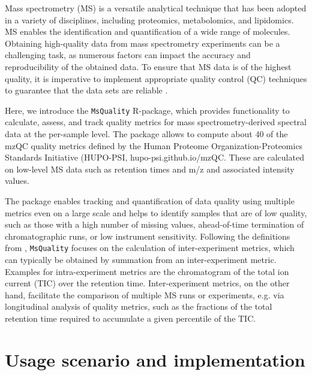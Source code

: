 \documentclass{bioinfo}
\begin{document}

\maketitle

Mass spectrometry (MS) is a versatile analytical technique that has been 
adopted in a variety of disciplines, including proteomics, metabolomics, and 
lipidomics. MS enables the identification and quantification of a wide range 
of molecules. Obtaining high-quality data from mass spectrometry experiments 
can be a challenging task, as numerous factors can impact the accuracy and 
reproducibility of the obtained data. To ensure that MS data is of the 
highest quality, it is imperative to implement appropriate quality control 
(QC) techniques to guarantee that the data sets are reliable 
\citep{Koecher2011}.

Here, we introduce the \texttt{MsQuality} R-package, which provides 
functionality to calculate, assess, and track quality metrics for mass 
spectrometry-derived spectral data at the per-sample level. 
The package allows to compute about 40 of the mzQC quality metrics defined by
the Human Proteome Organization-Proteomics Standards Initiative (HUPO-PSI,
hupo-psi.github.io/mzQC. These are calculated on low-level MS data
such as retention times and m/z and associated intensity values.

The package enables tracking and quantification of data quality using 
multiple metrics even on a large scale and helps to identify samples that 
are of low quality, such as those with a high number of missing values, 
ahead-of-time termination of chromatographic runs, or low instrument sensitivity. 
Following the definitions from \cite{Bittremieux2017}, \texttt{MsQuality}
focuses on the calculation of inter-experiment metrics, which can typically be 
obtained by summation from an inter-experiment metric. Examples for
intra-experiment metrics are the chromatogram of the total ion current (TIC) 
over the retention time. Inter-experiment metrics, on the other hand, 
facilitate the comparison of multiple MS runs or experiments, 
e.g. via longitudinal analysis of quality metrics, such as the
fractions of the total retention time required to accumulate a given
percentile of the TIC.

\section{Usage scenario and implementation} \label{usagescenario}
\end{document}
